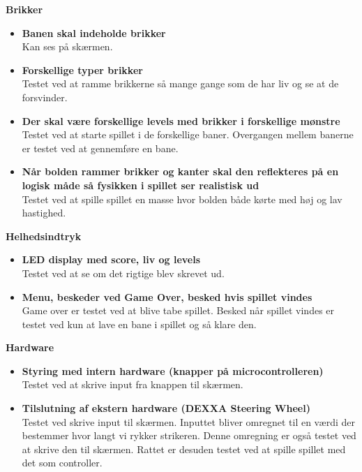 \textbf{Brikker}
\begin{itemize}
\item \textbf{Banen skal indeholde brikker}
\\ Kan ses på skærmen.
\item \textbf{Forskellige typer brikker}
\\ Testet ved at ramme brikkerne så mange gange som de har liv og se at de forsvinder.
\item \textbf{Der skal være forskellige levels med brikker i forskellige mønstre}
\\ Testet ved at starte spillet i de forskellige baner. Overgangen mellem banerne er testet ved at gennemføre en bane. 
\item \textbf{Når bolden rammer brikker og kanter skal den reflekteres på en logisk måde så fysikken i spillet ser realistisk ud}
\\ Testet ved at spille spillet en masse hvor bolden både kørte med høj og lav hastighed. 
\end{itemize}

\textbf{Helhedsindtryk}
\begin{itemize}
\item \textbf{LED display med score, liv og levels}
\\ Testet ved at se om det rigtige blev skrevet ud.
\item \textbf{Menu, beskeder ved Game Over, besked hvis spillet vindes}
\\ Game over er testet ved at blive tabe spillet. Besked når spillet vindes er testet ved kun at lave en bane i spillet og så klare den. 
\end{itemize}

\textbf{Hardware}
\begin{itemize}
\item \textbf{Styring med intern hardware (knapper på microcontrolleren)}
\\ Testet ved at skrive input fra knappen til skærmen. 
\item \textbf{Tilslutning af ekstern hardware (DEXXA Steering Wheel)}
\\ Testet ved skrive input til skærmen. Inputtet bliver omregnet til en værdi der bestemmer hvor langt vi rykker strikeren. Denne omregning er også testet ved at skrive den til skærmen. Rattet er desuden testet ved at spille spillet med det som controller. 
\end{itemize}